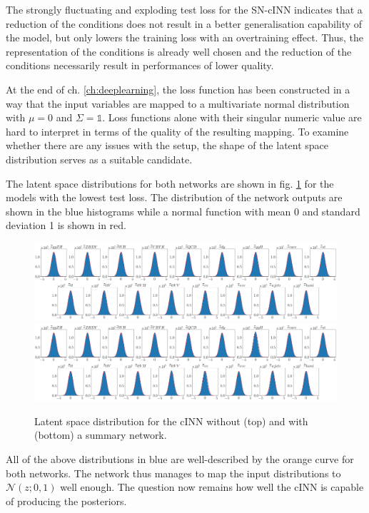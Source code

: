 The strongly fluctuating and exploding test loss for the SN-cINN indicates that a reduction of the conditions does not result in a better generalisation capability of the model, but only lowers the training loss with an overtraining effect. Thus, the representation of the conditions is already well chosen and the reduction of the conditions necessarily result in performances of lower quality.


At the end of ch. \ref{ch:deeplearning}, the loss function has been constructed in a way that the input variables are mapped to a multivariate normal distribution with $\mu = 0$ and $\Sigma=\mathds{1}$. Loss functions alone with their singular numeric value are hard to interpret in terms of the quality of the resulting mapping. To examine whether there are any issues with the setup, the shape of the latent space distribution serves as a suitable candidate.

The latent space distributions for both networks are shown in fig. \ref{fig:latents} for the models with the lowest test loss. The distribution of the network outputs are shown in the blue histograms while a normal function with mean 0 and standard deviation 1 is shown in red.

\begin{figure}[h!]
	\centering
	\includegraphics[width=\textwidth]{figures/inference/ls.png}
	\includegraphics[width=\textwidth]{figures/inference/ls_SN.png}
	\caption{Latent space distribution for the cINN without (top) and with (bottom) a summary network.}
	\label{fig:latents}
\end{figure}

All of the above distributions in blue are well-described by the orange curve for both networks. The network thus manages to map the input distributions to $\mathcal{N}(z; 0,1)$ well enough. The question now remains how well the cINN is capable of producing the posteriors.

